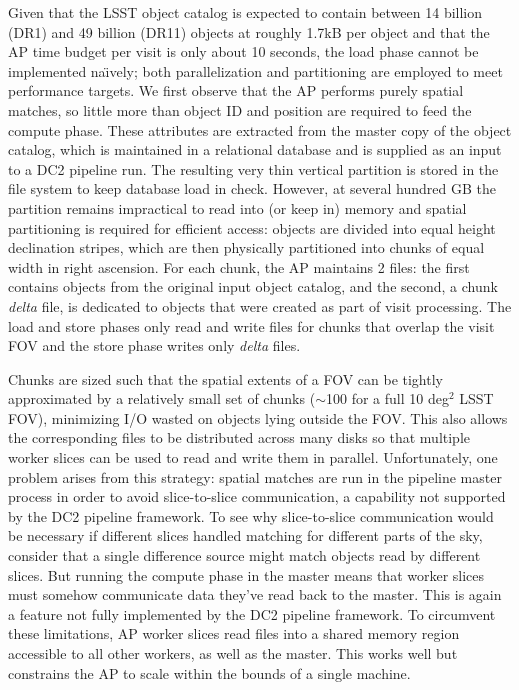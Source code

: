 Given that the LSST object catalog is expected to contain between 14 billion
(DR1) and 49 billion (DR11) objects at roughly 1.7kB per object and that the
AP time budget per visit is only about 10 seconds, the load phase cannot be
implemented na{\"\i}vely; both parallelization and partitioning are employed to
meet performance targets. We first observe that the AP performs purely spatial
matches, so little more than object ID and position are required to feed the
compute phase. These attributes are extracted from the master copy of the
object catalog, which is maintained in a relational database and is supplied
as an input to a DC2 pipeline run. The resulting very thin vertical partition
is stored in the file system to keep database load in check. However, at
several hundred GB the partition remains impractical to read into (or keep in)
memory and spatial partitioning is required for efficient access: objects are
divided into equal height declination stripes, which are then physically
partitioned into chunks of equal width in right ascension. For each chunk, the
AP maintains 2 files: the first contains objects from the original input object
catalog, and the second, a chunk \emph{delta} file, is dedicated to objects that
were created as part of visit processing. The load and store phases only read
and write files for chunks that overlap the visit FOV and the store phase
writes only \emph{delta} files.

Chunks are sized such that the spatial extents of a FOV can be tightly
approximated by a relatively small set of chunks (\ensuremath{\sim}100
for a full 10 deg$^{2}$ LSST FOV), minimizing I/O wasted on objects
lying outside the FOV. This also allows the corresponding files to be
distributed across many disks so that multiple worker slices can be used
to read and write them in parallel. Unfortunately, one problem arises from
this strategy: spatial matches are run in the pipeline master process in
order to avoid slice-to-slice communication, a capability not
supported by the DC2 pipeline framework. To see why slice-to-slice
communication would be necessary if different slices handled matching for
different parts of the sky, consider that a single difference source might
match objects read by different slices. But running the compute phase
in the master means that worker slices must somehow communicate data they've
read back to the master. This is again a feature not fully implemented by the
DC2 pipeline framework. To circumvent these limitations, AP worker slices read
files into a shared memory region accessible to all other workers, as well as
the master. This works well but constrains the AP to scale within the bounds
of a single machine.

